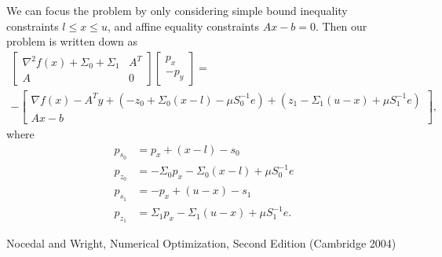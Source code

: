 \documentclass{article}
\begin{document}
We can focus the problem by only considering 
    simple bound inequality constraints $l \le x \le u$, and
    affine equality constraints $A x - b = 0$.
Then our problem is written down as
\begin{multline}
\begin{bmatrix}
    \nabla^2 f(x) + \Sigma_0 + \Sigma_1 & A^T \\
    A & 0 
\end{bmatrix}
\begin{bmatrix} p_x \\ -p_y \end{bmatrix}
    = \\ -
\begin{bmatrix}
    \nabla f(x) - A^T y + (-z_0 + \Sigma_0 (x - l) - \mu S_0^{-1} e) 
                        + (z_1 - \Sigma_1 (u - x) + \mu S_1^{-1} e) \\
    A x - b
\end{bmatrix},
\end{multline}
where
\begin{align}
    p_{s_0} &= p_x + (x - l) - s_0 \\
    p_{z_0} &= -\Sigma_0 p_x - \Sigma_0 (x - l) + \mu S_0^{-1} e \\
    p_{s_1} &= -p_x + (u - x) - s_1 \\
    p_{z_1} &= \Sigma_1 p_x - \Sigma_1 (u - x) + \mu S_1^{-1} e.
\end{align}




\begin{thebibliography}{99}
 Nocedal and Wright, 
    Numerical Optimization, Second Edition (Cambridge 2004)
\end{thebibliography}
\end{document}

